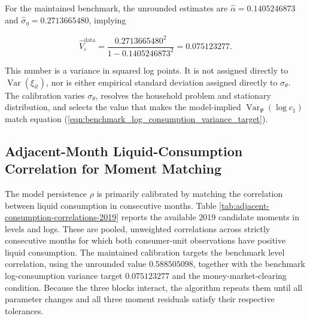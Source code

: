 \documentclass[11pt]{article}
\begin{document}
\begin{table}[htbp]
	\centering
	\small
	\setlength{\tabcolsep}{8pt}
	\renewcommand{\arraystretch}{1.2}
	\caption{Monthly empirical residual-process estimates and implied variance moments, 2018--2019}
	\label{tab:liquidity-demand-innovation-volatility-2018-2019}
\end{table}

For the maintained benchmark, the unrounded estimates are $\widehat{\alpha}=0.1405246873$ and $\widehat{\sigma}_\eta=0.2713665480$, implying

\begin{equation}
	\label{eqn:benchmark_log_consumption_variance_target}
	\widehat{V}_{\varepsilon}^{\mathrm{data}}
	=
	\frac{0.2713665480^2}{1-0.1405246873^2}
	=0.075123277.
\end{equation}

This number is a variance in squared log points. It is not assigned directly to $\operatorname{Var}(\xi_{it})$, nor is either empirical standard deviation assigned directly to $\sigma_\theta$. The calibration varies $\sigma_\theta$, resolves the household problem and stationary distribution, and selects the value that makes the model-implied $\operatorname{Var}_{\Psi}(\log c_1)$ match equation (\ref{eqn:benchmark_log_consumption_variance_target}).

\subsection{Adjacent-Month Liquid-Consumption Correlation for Moment Matching}

The model persistence $\rho$ is primarily calibrated by matching the correlation between liquid consumption in consecutive months. Table \ref{tab:adjacent-consumption-correlations-2019} reports the available 2019 candidate moments in levels and logs. These are pooled, unweighted correlations across strictly consecutive months for which both consumer-unit observations have positive liquid consumption. The maintained calibration targets the benchmark level correlation, using the unrounded value $0.588505098$, together with the benchmark log-consumption variance target $0.075123277$ and the money-market-clearing condition. Because the three blocks interact, the algorithm repeats them until all parameter changes and all three moment residuals satisfy their respective tolerances.
\end{document}
